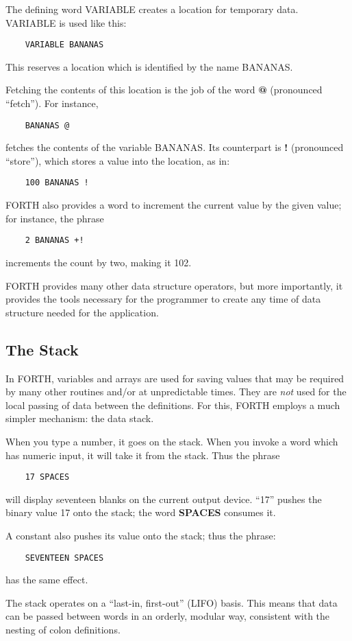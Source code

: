 The defining word VARIABLE creates a location for temporary data.  
VARIABLE is used like this:
\begin{verbatim}
    VARIABLE BANANAS
\end{verbatim}
This reserves a location which is identified by the name BANANAS.

Fetching the contents of this location is the job of the word {\bf @}
(pronounced ``fetch'').  For instance,
\begin{verbatim}
    BANANAS @
\end{verbatim}
fetches the contents of the variable BANANAS.  Its counterpart is {\bf !}
(pronounced ``store''), which stores a value into the location, as in:
\begin{verbatim}
    100 BANANAS !
\end{verbatim}
FORTH also provides a word to increment the current value by the given
value; for instance, the phrase
\begin{verbatim}
    2 BANANAS +!
\end{verbatim}
increments the count by two, making it 102.

FORTH provides many other data structure operators, but more
importantly, it provides the tools necessary for the programmer to
create any time of data structure needed for the application.
\subsection{The Stack}
In FORTH, variables and arrays are used for saving values that may be
required by many other routines and/or at unpredictable times.  They are {\em not}
used for the local passing of data between the definitions.  For this, FORTH
employs a much simpler mechanism: the data stack.

When you type a number, it goes on the stack.  When you invoke a 
word which has numeric input, it will take it from the stack.  Thus the
phrase
\begin{verbatim}
    17 SPACES
\end{verbatim}
will display seventeen blanks on the current output device.  ``17'' pushes
the binary value 17 onto the stack; the word {\bf SPACES} consumes it.

A constant also pushes its value onto the stack; thus the phrase:
\begin{verbatim}
    SEVENTEEN SPACES
\end{verbatim}
has the same effect.

The stack operates on a ``last-in, first-out'' (LIFO) basis.  This means
that data can be passed between words in an orderly, modular way, consistent
with the nesting of colon definitions.

